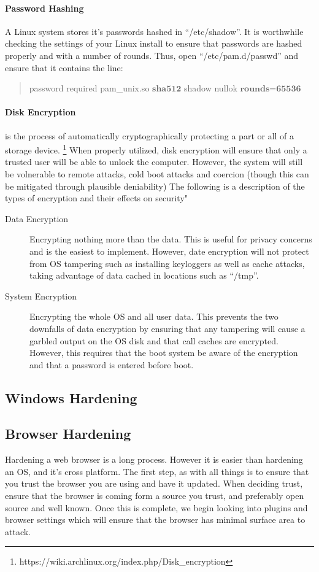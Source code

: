 \documentclass[a4paper,11pt,draft]{article}
\begin{document}
		\paragraph{Password Hashing}
			A Linux system stores it's passwords hashed in ``/etc/shadow''. 
			It is worthwhile checking the settings of your Linux install to ensure that passwords are hashed properly and with a number of rounds. Thus, open ``/etc/pam.d/passwd'' and ensure that it contains the line:
			\begin{quote}
				password	required	pam\_unix.so $\textbf{sha512}$ shadow nullok $\textbf{rounds=65536}$
			\end{quote}
		\paragraph{Disk Encryption}
			is the process of automatically cryptographically protecting a part or all of a storage device.
			\footnote{https://wiki.archlinux.org/index.php/Disk\_encryption}
			When properly utilized, disk encryption will ensure that only a trusted user will be able to unlock the computer. 
			However, the system will still be volnerable to remote attacks, cold boot attacks and coercion (though this can be mitigated through plausible deniability)
			The following is a description of the types of encryption and their effects on security"
			\begin{description}
				\item[Data Encryption] Encrypting nothing more than the data. 
					This is useful for privacy concerns and is the easiest to implement. 
					However, date encryption will not protect from OS tampering such as installing keyloggers as well as cache attacks, taking advantage of data cached in locations such as ``/tmp''.
				\item[System Encryption] Encrypting the whole OS and all user data. 
					This prevents the two downfalls of data encryption by ensuring that any tampering will cause a garbled output on the OS disk and that call caches are encrypted. 
					However, this requires that the boot system be aware of the encryption and that a password is entered before boot. 
			\end{description}
			

	\subsection{Windows Hardening}
	\subsection{Browser Hardening}
		\newpage Hardening a web browser is a long process. However it is easier than hardening an OS, and it's cross platform. 
		The first step, as with all things is to ensure that you trust the browser you are using and have it updated. 
		When deciding trust, ensure that the browser is coming form a source you trust, and preferably open source and well known. 
		Once this is complete, we begin looking into plugins and browser settings which will ensure that the browser has minimal surface area to attack. 
\end{document}
